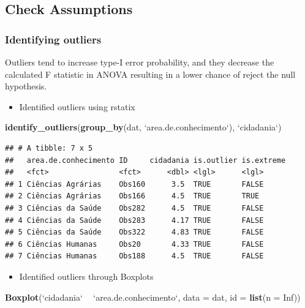 \documentclass[]{article}
\newenvironment{Shaded}{\begin{snugshade}}{\end{snugshade}}
\newcommand{\DataTypeTok}[1]{\textcolor[rgb]{0.13,0.29,0.53}{#1}}
\newcommand{\KeywordTok}[1]{\textcolor[rgb]{0.13,0.29,0.53}{\textbf{#1}}}
\newcommand{\NormalTok}[1]{#1}
\newcommand{\OperatorTok}[1]{\textcolor[rgb]{0.81,0.36,0.00}{\textbf{#1}}}
\newcommand{\OtherTok}[1]{\textcolor[rgb]{0.56,0.35,0.01}{#1}}
\newcommand{\StringTok}[1]{\textcolor[rgb]{0.31,0.60,0.02}{#1}}
\providecommand{\tightlist}{%
  \setlength{\itemsep}{0pt}\setlength{\parskip}{0pt}}
\begin{document}
\hypertarget{check-assumptions}{%
\subsection{Check Assumptions}\label{check-assumptions}}

\hypertarget{identifying-outliers}{%
\subsubsection{Identifying outliers}\label{identifying-outliers}}

Outliers tend to increase type-I error probability, and they decrease
the calculated F statistic in ANOVA resulting in a lower chance of
reject the null hypothesis.

\begin{itemize}
\tightlist
\item
  Identified outliers using rstatix
\end{itemize}

\begin{Shaded}
\begin{Highlighting}[]
\KeywordTok{identify_outliers}\NormalTok{(}\KeywordTok{group_by}\NormalTok{(dat, }\StringTok{`}\DataTypeTok{area.de.conhecimento}\StringTok{`}\NormalTok{), }\StringTok{`}\DataTypeTok{cidadania}\StringTok{`}\NormalTok{)}
\end{Highlighting}
\end{Shaded}

\begin{verbatim}
## # A tibble: 7 x 5
##   area.de.conhecimento ID     cidadania is.outlier is.extreme
##   <fct>                <fct>      <dbl> <lgl>      <lgl>     
## 1 Ciências Agrárias    Obs160      3.5  TRUE       FALSE     
## 2 Ciências Agrárias    Obs166      4.5  TRUE       TRUE      
## 3 Ciências da Saúde    Obs282      4.5  TRUE       FALSE     
## 4 Ciências da Saúde    Obs283      4.17 TRUE       FALSE     
## 5 Ciências da Saúde    Obs322      4.83 TRUE       FALSE     
## 6 Ciências Humanas     Obs20       4.33 TRUE       FALSE     
## 7 Ciências Humanas     Obs188      4.5  TRUE       FALSE
\end{verbatim}

\begin{itemize}
\tightlist
\item
  Identified outliers through Boxplots
\end{itemize}

\begin{Shaded}
\begin{Highlighting}[]
\KeywordTok{Boxplot}\NormalTok{(}\StringTok{`}\DataTypeTok{cidadania}\StringTok{`} \OperatorTok{~}\StringTok{ `}\DataTypeTok{area.de.conhecimento}\StringTok{`}\NormalTok{, }\DataTypeTok{data =}\NormalTok{ dat, }\DataTypeTok{id =} \KeywordTok{list}\NormalTok{(}\DataTypeTok{n =} \OtherTok{Inf}\NormalTok{))}
\end{Highlighting}
\end{Shaded}
\end{document}
